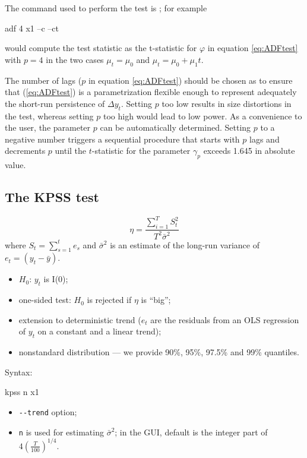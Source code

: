 The  command used to perform the test is ; for example
\begin{code}
  adf 4 x1 --c --ct
\end{code}
would compute the test statistic as the t-statistic for $\varphi$ in
equation \ref{eq:ADFtest} with $p=4$ in the two cases $\mu_t = \mu_0$
and $\mu_t = \mu_0 + \mu_1 t$.

The number of lags ($p$ in equation \ref{eq:ADFtest}) should be chosen
as to ensure that (\ref{eq:ADFtest}) is a parametrization flexible
enough to represent adequately the short-run persistence of $\Delta
y_t$. Setting $p$ too low results in size distortions in the test,
whereas setting $p$ too high would lead to low power. As a convenience
to the user, the parameter $p$ can be automatically determined.
Setting $p$ to a negative number triggers a sequential procedure that
starts with $p$ lags and decrements $p$ until the $t$-statistic for
the parameter $\gamma_p$ exceeds 1.645 in absolute value.

\subsection{The KPSS test}
\label{sec:KPSStest}

\begin{equation}
  \label{eq:KPSStest}
  \eta = \frac{\sum_{i=1}^T S_t^2 }{ T^2 \bar{\sigma}^2 }
\end{equation}
where $S_t = \sum_{s=1}^t e_s$ and $\bar{\sigma}^2$ is an
estimate of the long-run variance of $e_t = (y_t - \bar{y})$.
\begin{itemize}
\item $H_0$: $y_t$ is I(0);
\item one-sided test: $H_0$ is rejected if $\eta$ is ``big'';
\item extension to deterministic trend ($e_t$ are the residuals from
  an OLS regression of $y_t$ on a constant and a linear trend);
\item nonstandard distribution --- we provide 90\%, 95\%, 97.5\% and
  99\% quantiles.
\end{itemize}
Syntax:
\begin{code}
  kpss n x1
\end{code}
\begin{itemize}
\item \verb|--trend| option;
\item \verb|n| is used for estimating $\bar{\sigma}^2$; in the GUI,
  default is the integer part of $4 \left( \frac{T}{100}
  \right)^{1/4}$.
\end{itemize}

